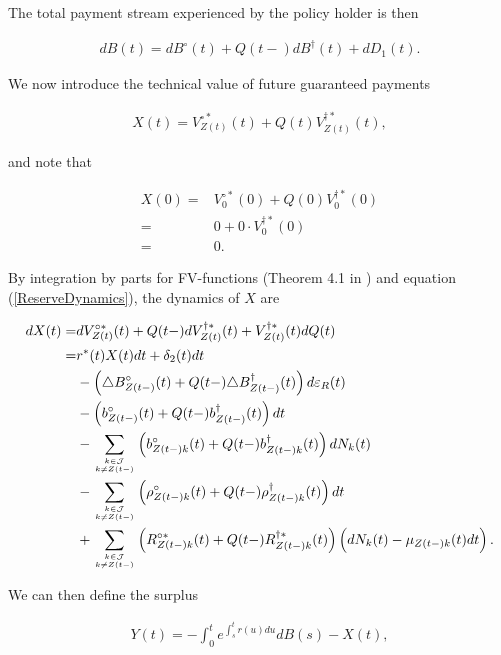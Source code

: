 \documentclass{article}
\newcommand{\1}[1]{\mathbbm{1}_{\left\lbrace #1 \right\rbrace}}
\theoremstyle{break}
\theoremstyle{remark}
\numberwithin{equation}{section}
\begin{document}
The total payment stream experienced by the policy holder is then

\begin{align} \label{WithProfitTotalBenefits}
dB(t) = dB^\circ(t) + Q(t-) dB^\dagger(t) + dD_1(t).
\end{align}

We now introduce the technical value of future guaranteed payments

\begin{align*}
X(t) = V_{Z(t)}^{\circ*}(t) + Q(t) V_{Z(t)}^{\dagger*}(t),
\end{align*}

and note that 

\begin{align*}
X(0) =& V_{0}^{\circ*}(0) + Q(0) V_{0}^{\dagger*}(0) \\
=& 0 + 0 \cdot V_{0}^{\dagger*}(0) \\
=& 0.
\end{align*}

By integration by parts for FV-functions (Theorem 4.1 in \cite{LivStok}) and equation (\ref{ReserveDynamics}), the dynamics of $X$ are

\begin{align} \label{XDynamics}
\begin{split}
dX(t) =& dV_{Z(t)}^{\circ*}(t) + Q(t-) dV_{Z(t)}^{\dagger*}(t) + V_{Z(t)}^{\dagger*}(t) dQ(t) \\
=& r^*(t) X(t) dt + \delta_2(t)dt \\
&- \left( \triangle B_{Z(t-)}^\circ(t) + Q(t-) \triangle B_{Z(t-)}^\dagger(t) \right) d \varepsilon_{R}(t) \\
&- \left( b_{Z(t-)}^\circ(t) + Q(t-) b_{Z(t-)}^\dagger(t) \right) dt \\
&- \sum_{k \in \mathcal{J} \atop k \neq Z(t-)} \left( b_{Z(t-)k}^\circ(t) + Q(t-) b_{Z(t-)k}^\dagger(t)\right) dN_k(t) \\
&- \sum_{k \in \mathcal{J} \atop k \neq Z(t-)} \left( \rho_{Z(t-)k}^\circ(t) + Q(t-) \rho_{Z(t-)k}^\dagger(t) \right) dt \\
&+ \sum_{k \in \mathcal{J} \atop k \neq Z(t-)} \left( R_{Z(t-)k}^{\circ*}(t) + Q(t-) R_{Z(t-)k}^{\dagger*}(t) \right) \left( dN_k(t) - \mu_{Z(t-)k}(t) dt \right).
\end{split}
\end{align}

We can then define the surplus

\begin{align*}
Y(t) = - \int_0^t e^{\int_s^t r(u)du} dB(s) - X(t),
\end{align*}
\end{document}
